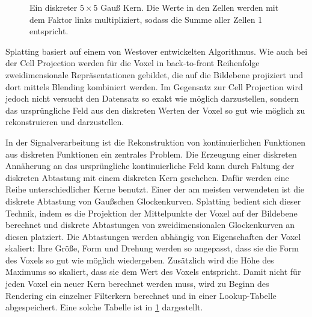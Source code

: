 \documentclass[a4paper,fontsize=12pt,toc=bib,parskip=half,ngerman]{scrartcl}
\begin{document}
\begin{figure}
	\centering
	\caption{Ein diskreter $5\times5$ Gau{\ss} Kern. Die Werte in den Zellen werden mit dem Faktor links multipliziert, sodass die Summe aller Zellen 1 entspricht.}
	\label{kernel}
\end{figure}

Splatting basiert auf einem von Westover entwickelten Algorithmus\cite{westover1990footprint,westover1989interactive}. Wie auch bei der Cell Projection werden f\"ur die Voxel in back-to-front Reihenfolge zweidimensionale Repr\"asentationen gebildet, die auf die Bildebene projiziert und dort mittels Blending kombiniert werden. Im Gegensatz zur Cell Projection wird jedoch nicht versucht den Datensatz so exakt wie m\"oglich darzustellen, sondern das urspr\"ungliche Feld aus den diskreten Werten der Voxel so gut wie m\"oglich zu rekonstruieren und darzustellen. 

In der Signalverarbeitung ist die Rekonstruktion von kontinuierlichen Funktionen aus diskreten Funktionen ein zentrales Problem. Die Erzeugung einer diskreten Ann\"aherung an das urspr\"ungliche kontinuierliche Feld kann durch Faltung der diskreten Abtastung mit einem diskreten Kern geschehen. Daf\"ur werden eine Reihe unterschiedlicher Kerne benutzt. Einer der am meisten verwendeten ist die diskrete Abtastung von Gau{\ss}schen Glockenkurven. Splatting bedient sich dieser Technik, indem es die Projektion der Mittelpunkte der Voxel auf der Bildebene berechnet und diskrete Abtastungen von zweidimensionalen Glockenkurven an diesen platziert. Die Abtastungen werden abh\"angig von Eigenschaften der Voxel skaliert: Ihre Gr\"o{\ss}e, Form und Drehung werden so angepasst, dass sie die Form des Voxels so gut wie m\"oglich wiedergeben. Zus\"atzlich wird die H\"ohe des Maximums so skaliert, dass sie dem Wert des Voxels entspricht. Damit nicht f\"ur jeden Voxel ein neuer Kern berechnet werden muss, wird zu Beginn des Rendering ein einzelner Filterkern berechnet und in einer Lookup-Tabelle abgespeichert. Eine solche Tabelle ist in \cref{kernel} dargestellt.
\end{document}
